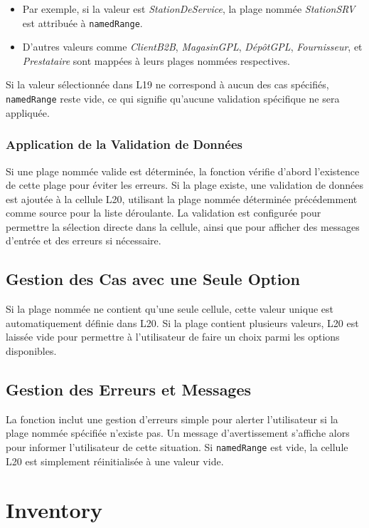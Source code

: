 \documentclass[a4paper, oneside, 12pt, final]{extreport}
\begin{document}
\begin{itemize}
    \item Par exemple, si la valeur est \textit{StationDeService}, la plage nommée \textit{StationSRV} est attribuée à \texttt{namedRange}.
    \item D'autres valeurs comme \textit{ClientB2B}, \textit{MagasinGPL}, \textit{DépôtGPL}, \textit{Fournisseur}, et \textit{Prestataire} sont mappées à leurs plages nommées respectives.
\end{itemize}

Si la valeur sélectionnée dans L19 ne correspond à aucun des cas spécifiés, \texttt{namedRange} reste vide, ce qui signifie qu'aucune validation spécifique ne sera appliquée.

\subsubsection{Application de la Validation de Données}
Si une plage nommée valide est déterminée, la fonction vérifie d'abord l'existence de cette plage pour éviter les erreurs. Si la plage existe, une validation de données est ajoutée à la cellule L20, utilisant la plage nommée déterminée précédemment comme source pour la liste déroulante. La validation est configurée pour permettre la sélection directe dans la cellule, ainsi que pour afficher des messages d'entrée et des erreurs si nécessaire.

\subsection{Gestion des Cas avec une Seule Option}
Si la plage nommée ne contient qu'une seule cellule, cette valeur unique est automatiquement définie dans L20. Si la plage contient plusieurs valeurs, L20 est laissée vide pour permettre à l'utilisateur de faire un choix parmi les options disponibles.

\subsection{Gestion des Erreurs et Messages}
La fonction inclut une gestion d'erreurs simple pour alerter l'utilisateur si la plage nommée spécifiée n'existe pas. Un message d'avertissement s'affiche alors pour informer l'utilisateur de cette situation. Si \texttt{namedRange} est vide, la cellule L20 est simplement réinitialisée à une valeur vide.
\section{Inventory}
\end{document}

